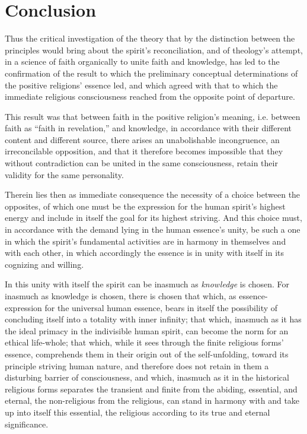 \documentclass[12pt,a4paper]{book}
\begin{document}
\chapter*{Conclusion}
\label{ch:conclusion}

Thus the critical investigation of the theory that by the distinction between the principles
would bring about the spirit's reconciliation, and of theology's attempt, in a science of faith
organically to unite faith and knowledge, has led to the confirmation of the result to which the
preliminary conceptual determinations of the positive religions' essence led, and which agreed
with that to which the immediate religious consciousness reached from the opposite point of
departure.

This result was that between faith in the positive religion's meaning, i.e. between faith as
``faith in revelation,'' and knowledge, in accordance with their different content and different
source, there arises an unabolishable incongruence, an irreconcilable opposition, and that it
therefore becomes impossible that they without contradiction can be united in the same
consciousness, retain their validity for the same personality.

Therein lies then as immediate consequence the necessity of a choice between the opposites, of
which one must be the expression for the human spirit's highest energy and include in itself the
goal for its highest striving. And this choice must, in accordance with the demand lying in the
human essence's unity, be such a one in which the spirit's fundamental activities are in harmony
in themselves and with each other, in which accordingly the essence is in unity with itself in its
cognizing and willing.

In this unity with itself the spirit can be inasmuch as \emph{knowledge} is chosen. For inasmuch as
knowledge is chosen, there is chosen that which, as essence-expression for the universal human
essence, bears in itself the possibility of concluding itself into a totality with inner infinity;
that which, inasmuch as it has the ideal primacy in the indivisible human spirit, can become the
norm for an ethical life-whole; that which, while it sees through the finite religious forms'
essence, comprehends them in their origin out of the self-unfolding, toward its principle striving
human nature, and therefore does not retain in them a disturbing barrier of consciousness, and
which, inasmuch as it in the historical religious forms separates the transient and finite from the
abiding, essential, and eternal, the non-religious from the religious, can stand in harmony with
and take up into itself this essential, the religious according to its true and eternal significance.
\end{document}
